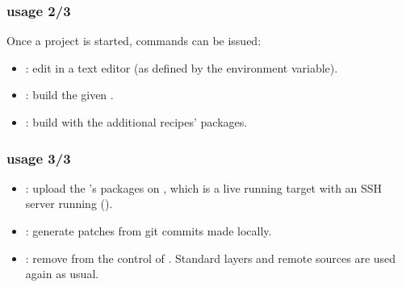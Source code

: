 \begin{frame}
  \frametitle{ usage 2/3}
  Once a  project is started, commands can be issued:
  \begin{itemize}
    \item {}: edit  in a text
      editor (as defined by the  environment variable).
    \item {}: build the given
      .
    \item {}: build  with
      the additional  recipes' packages.
  \end{itemize}
\end{frame}

\begin{frame}
  \frametitle{ usage 3/3}
  \begin{itemize}
    \item {}: upload the
      's packages on , which is a live
      running target with an SSH server running ().
    \item {}: generate patches from
      git commits made locally.
    \item {}: remove  from the
      control of . Standard layers and remote sources
      are used again as usual.
  \end{itemize}
\end{frame}
